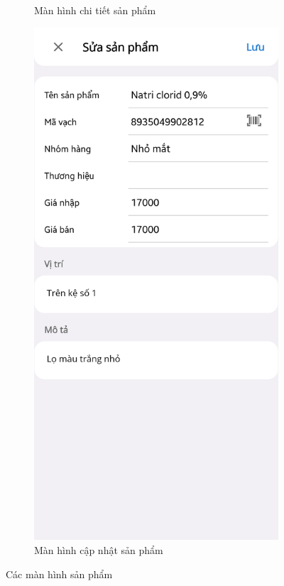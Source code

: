 \documentclass[../DoAn.tex]{subfiles}
\begin{document}
\begin{figure}[H]
\begin{subfigure}{0.49\linewidth}
        \caption{Màn hình chi tiết sản phẩm}
        \label{figure:screen-productdetailspage}
    \end{subfigure}
    \begin{subfigure}{0.5\linewidth}
        \centering
        \includegraphics[width=0.9\linewidth]{Hinhve/design/screens/ProductUpdatePage}
        \caption{Màn hình cập nhật sản phẩm}
        \label{figure:screen-productupdatepage}
    \end{subfigure}
    \caption{Các màn hình sản phẩm}
    \label{figure:screen-productpages2}
\end{figure}
\break
\end{document}
